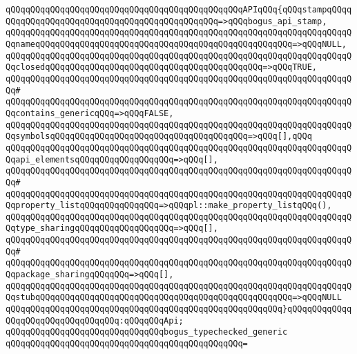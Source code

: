 \verb|qQQqqQQqqQQqqQQqqQQqqQQqqQQqqQQqqQQqqQQqqQQqqQQqAPIqQQq{qQQqstampqQQqqQQqqQQqqQQqqQQqqQQqqQQqqQQqqQQqqQQqqQQqqQQq=>qQQqbogus_api_stamp,|\newline
\verb|qQQqqQQqqQQqqQQqqQQqqQQqqQQqqQQqqQQqqQQqqQQqqQQqqQQqqQQqqQQqqQQqqQQqqQQqnameqQQqqQQqqQQqqQQqqQQqqQQqqQQqqQQqqQQqqQQqqQQqqQQqqQQq=>qQQqNULL,|\newline
\verb|qQQqqQQqqQQqqQQqqQQqqQQqqQQqqQQqqQQqqQQqqQQqqQQqqQQqqQQqqQQqqQQqqQQqqQQqclosedqQQqqQQqqQQqqQQqqQQqqQQqqQQqqQQqqQQqqQQqqQQq=>qQQqTRUE,|\newline
\verb|qQQqqQQqqQQqqQQqqQQqqQQqqQQqqQQqqQQqqQQqqQQqqQQqqQQqqQQqqQQqqQQqqQQqqQQq#|\newline
\verb|qQQqqQQqqQQqqQQqqQQqqQQqqQQqqQQqqQQqqQQqqQQqqQQqqQQqqQQqqQQqqQQqqQQqqQQqcontains_genericqQQq=>qQQqFALSE,|\newline
\verb|qQQqqQQqqQQqqQQqqQQqqQQqqQQqqQQqqQQqqQQqqQQqqQQqqQQqqQQqqQQqqQQqqQQqqQQqsymbolsqQQqqQQqqQQqqQQqqQQqqQQqqQQqqQQqqQQqqQQq=>qQQq[],qQQq|\newline
\verb|qQQqqQQqqQQqqQQqqQQqqQQqqQQqqQQqqQQqqQQqqQQqqQQqqQQqqQQqqQQqqQQqqQQqqQQqapi_elementsqQQqqQQqqQQqqQQqqQQq=>qQQq[],|\newline
\verb|qQQqqQQqqQQqqQQqqQQqqQQqqQQqqQQqqQQqqQQqqQQqqQQqqQQqqQQqqQQqqQQqqQQqqQQq#|\newline
\verb|qQQqqQQqqQQqqQQqqQQqqQQqqQQqqQQqqQQqqQQqqQQqqQQqqQQqqQQqqQQqqQQqqQQqqQQqproperty_listqQQqqQQqqQQqqQQq=>qQQqpl::make_property_listqQQq(),|\newline
\verb|qQQqqQQqqQQqqQQqqQQqqQQqqQQqqQQqqQQqqQQqqQQqqQQqqQQqqQQqqQQqqQQqqQQqqQQqtype_sharingqQQqqQQqqQQqqQQqqQQq=>qQQq[],|\newline
\verb|qQQqqQQqqQQqqQQqqQQqqQQqqQQqqQQqqQQqqQQqqQQqqQQqqQQqqQQqqQQqqQQqqQQqqQQq#|\newline
\verb|qQQqqQQqqQQqqQQqqQQqqQQqqQQqqQQqqQQqqQQqqQQqqQQqqQQqqQQqqQQqqQQqqQQqqQQqpackage_sharingqQQqqQQq=>qQQq[],|\newline
\verb|qQQqqQQqqQQqqQQqqQQqqQQqqQQqqQQqqQQqqQQqqQQqqQQqqQQqqQQqqQQqqQQqqQQqqQQqstubqQQqqQQqqQQqqQQqqQQqqQQqqQQqqQQqqQQqqQQqqQQqqQQqqQQq=>qQQqNULL|\newline
\verb|qQQqqQQqqQQqqQQqqQQqqQQqqQQqqQQqqQQqqQQqqQQqqQQqqQQqqQQq}qQQqqQQqqQQqqQQqqQQqqQQqqQQqqQQqqQQq:qQQqqQQqApi;|\newline
\newline
\verb|qQQqqQQqqQQqqQQqqQQqqQQqqQQqqQQqbogus_typechecked_generic|\newline
\verb|qQQqqQQqqQQqqQQqqQQqqQQqqQQqqQQqqQQqqQQqqQQqqQQq=|\newline
